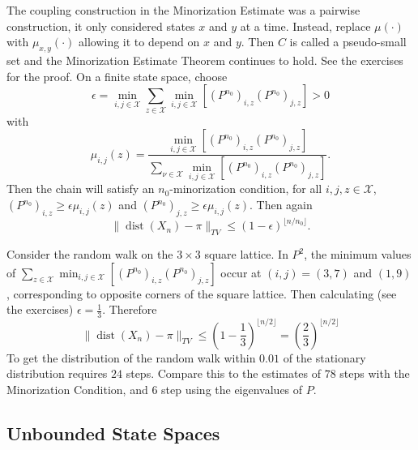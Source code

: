 \documentclass[12pt]{article}
\begin{document}
The coupling construction in the Minorization Estimate was a pairwise
construction, it only considered states \( x \) and \( y \) at a time.
Instead, replace \( \mu(\cdot) \) with \( \mu_{x,y}(\cdot) \) allowing
it to depend on \( x \) and \( y \).  Then \( C \) is called a
pseudo-small set and the Minorization Estimate Theorem continues to
hold.  See the exercises for the proof.  On a finite state space, choose
\[
    \epsilon = \min_{i,j \in \mathcal{X}}\sum_{z \in \mathcal{X}} \min_{i,j
    \in \mathcal{X}} \left[ (P^{n_0})_{i,z} (P^{n_0})_{j,z} \right] > 0
\] with
\[
    \mu_{i,j}(z) = \frac{\min_{i,j \in \mathcal{X}} \left[ (P^{n_0})_{i,z}
    (P^{n_0})_{j,z} \right]}{\sum_{\nu \in \mathcal{X}} \min_{i,j \in
    \mathcal{X}} \left[ (P^{n_0})_{i,z} (P^{n_0})_{j,z} \right] }.
\] Then the chain will satisfy an \( n_0 \)-minorization condition, for
all \( i,j,z \in \mathcal{X} \), \( (P^{n_0})_{i,z} \ge \epsilon \mu_{i,j}
(z) \) and \( (P^{n_0})_{j,z} \ge \epsilon \mu_{i,j}(z) \).  Then again
\[
    \|
    \operatorname{dist}
    (X_n) - \pi \|_{TV} \le (1-\epsilon)^{\lfloor n/n_0 \rfloor}.
\]

\begin{example}
    Consider the random walk on the \( 3 \times 3 \) square lattice.  In
    \( P^2 \), the minimum values of \( \sum_{z \in \mathcal{X}} \min_{i,j
    \in \mathcal{X}} \left[ (P^{n_0})_{i,z} (P^{n_0})_{j,z} \right] \)
    occur at \( (i,j) = (3,7) \) and \( (1,9) \), corresponding to
    opposite corners of the square lattice.  Then calculating (see the
    exercises) \( \epsilon = \frac{1}{3} \).  Therefore
    \[
        \|
        \operatorname{dist}
        (X_n) - \pi \|_{TV} \le (1-\frac{1}{3})^{\lfloor n/2 \rfloor} =
        \left( \frac{2}{3} \right)^{\lfloor n/2 \rfloor}
    \] To get the distribution of the random walk within \( 0.01 \) of
    the stationary distribution requires \( 24 \) steps.  Compare this
    to the estimates of \( 78 \) steps with the Minorization Condition,
    and \( 6 \) step using the eigenvalues of \( P \).
\end{example}

\subsection*{Unbounded State Spaces}
\end{document}
